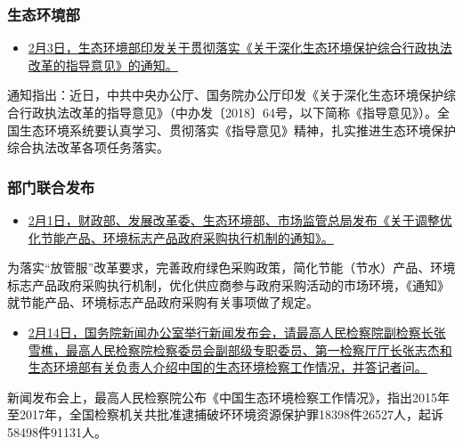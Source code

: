 \documentclass[]{book}
\providecommand{\tightlist}{%
  \setlength{\itemsep}{0pt}\setlength{\parskip}{0pt}}
\begin{document}
\hypertarget{ux751fux6001ux73afux5883ux90e8-1}{%
\subsubsection*{生态环境部}\label{ux751fux6001ux73afux5883ux90e8-1}}

\begin{itemize}
\tightlist
\item
  \href{http://www.mee.gov.cn/xxgk2018/xxgk/xxgk06/201902/t20190219_692776.html}{2月3日，生态环境部印发关于贯彻落实《关于深化生态环境保护综合行政执法改革的指导意见》的通知。}
\end{itemize}

通知指出：近日，中共中央办公厅、国务院办公厅印发《关于深化生态环境保护综合行政执法改革的指导意见》（中办发〔2018〕64号，以下简称《指导意见》）。全国生态环境系统要认真学习、贯彻落实《指导意见》精神，扎实推进生态环境保护综合执法改革各项任务落实。

\hypertarget{ux90e8ux95e8ux8054ux5408ux53d1ux5e03-3}{%
\subsubsection*{部门联合发布}\label{ux90e8ux95e8ux8054ux5408ux53d1ux5e03-3}}

\begin{itemize}
\tightlist
\item
  \href{http://www.mof.gov.cn/mofhome/guokusi/zhengfuxinxi/guizhangzhidu/201902/t20190212_3146226.html}{2月1日，财政部、发展改革委、生态环境部、市场监管总局发布《关于调整优化节能产品、环境标志产品政府采购执行机制的通知》。}
\end{itemize}

为落实``放管服''改革要求，完善政府绿色采购政策，简化节能（节水）产品、环境标志产品政府采购执行机制，优化供应商参与政府采购活动的市场环境，《通知》就节能产品、环境标志产品政府采购有关事项做了规定。

\begin{itemize}
\tightlist
\item
  \href{http://www.gov.cn/xinwen/2019-02/14/content_5365693.htm\#1}{2月14日，国务院新闻办公室举行新闻发布会，请最高人民检察院副检察长张雪樵，最高人民检察院检察委员会副部级专职委员、第一检察厅厅长张志杰和生态环境部有关负责人介绍中国的生态环境检察工作情况，并答记者问。}
\end{itemize}

新闻发布会上，最高人民检察院公布《中国生态环境检察工作情况》，指出2015年至2017年，全国检察机关共批准逮捕破坏环境资源保护罪18398件26527人，起诉58498件91131人。
\end{document}
